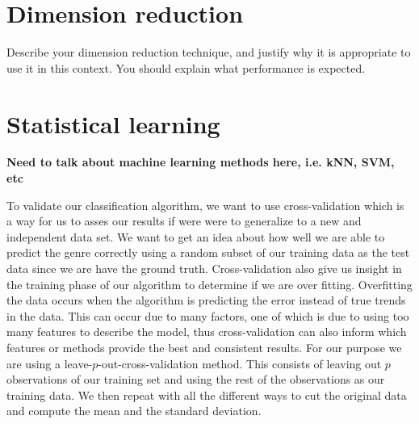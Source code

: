 \documentclass[12pt]{article}
\begin{document}
\section{Dimension reduction}
Describe your dimension reduction technique, and justify why it 
is appropriate to use it in this context. You should explain what 
performance is expected.
\section{Statistical learning}
\textbf{Need to talk about machine learning methods here, i.e. kNN, SVM, etc}

To validate our classification algorithm, we want to use cross-validation which is a way for us to asses our results if were were to generalize to a new and independent data set. We want to get an idea about how well we are able to predict the genre correctly using a random subset of our training data as the test data since we are have the ground truth. Cross-validation also give us insight in the training phase of our algorithm to determine if we are over fitting. Overfitting the data occurs when the algorithm is predicting the error instead of true trends in the data. This can occur due to many factors, one of which is due to using too many features to describe the model, thus cross-validation can also inform which features or methods provide the best and consistent results. For our purpose we are using a leave-$p$-out-cross-validation method. This consists of leaving out $p$ observations of our training set and using the rest of the observations as our training data. We then repeat with all the different ways to cut the original data and compute the mean and the standard deviation. 

\end{document}
